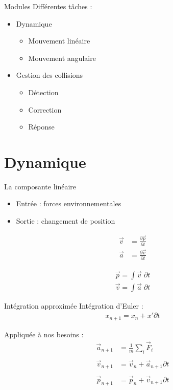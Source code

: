 \documentclass{beamer}
\newcommand{\deriv}{\partial \!}
\begin{document}
\begin{frame}{Modules}
  Différentes tâches :
  \begin{itemize}
  \item Dynamique
    \begin{itemize}
      \item Mouvement linéaire
      \item Mouvement angulaire
    \end{itemize}
  \item Gestion des collisions
    \begin{itemize}
    \item Détection
    \item Correction
    \item Réponse
    \end{itemize}
  \end{itemize}
\end{frame}

\section{Dynamique}

\begin{frame}{La composante linéaire}
  \begin{itemize}
    \item Entrée : forces environnementales
    \item Sortie : changement de position
  \end{itemize}

  \begin{align*}
    \vec{v} &= \frac{\deriv \vec{p}}{\deriv t} \\
    \vec{a} &= \frac{\deriv \vec{v}}{\deriv t}
  \end{align*}

  \begin{align*}
    \vec{p} = \int \vec{v}\; \deriv t \\
    \vec{v} = \int \vec{a}\; \deriv t
  \end{align*}

\end{frame}

\begin{frame}{Intégration approximée}
  Intégration d'Euler :
  \begin{align*}
    x_{n+1} = x_{n} + x' \deriv t
  \end{align*}

  \vfill

  Appliquée à nos besoins :
  \begin{align*}
    \vec{a}_{n+1} &= \frac{1}{m} \sum_i \vec{F}_i \\ \\
    \vec{v}_{n+1} &= \vec{v}_n + \vec{a}_{n+1} \deriv t \\ \\
    \vec{p}_{n+1} &= \vec{p}_n + \vec{v}_{n+1} \deriv t
  \end{align*}
\end{frame}
\end{document}
